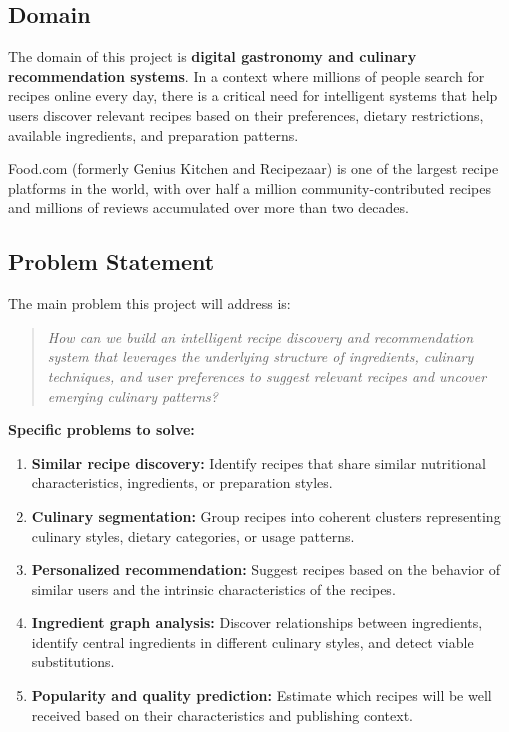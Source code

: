 \documentclass[11pt,a4paper]{article}
\begin{document}
\subsection{Domain}

The domain of this project is \textbf{digital gastronomy and culinary recommendation systems}. In a context where millions of people search for recipes online every day, there is a critical need for intelligent systems that help users discover relevant recipes based on their preferences, dietary restrictions, available ingredients, and preparation patterns.

Food.com (formerly Genius Kitchen and Recipezaar) is one of the largest recipe platforms in the world, with over half a million community-contributed recipes and millions of reviews accumulated over more than two decades.

\subsection{Problem Statement}

The main problem this project will address is:

\begin{quote}
\textit{How can we build an intelligent recipe discovery and recommendation system that leverages the underlying structure of ingredients, culinary techniques, and user preferences to suggest relevant recipes and uncover emerging culinary patterns?}
\end{quote}

\textbf{Specific problems to solve:}

\begin{enumerate}
    \item \textbf{Similar recipe discovery:} Identify recipes that share similar nutritional characteristics, ingredients, or preparation styles.

    \item \textbf{Culinary segmentation:} Group recipes into coherent clusters representing culinary styles, dietary categories, or usage patterns.

    \item \textbf{Personalized recommendation:} Suggest recipes based on the behavior of similar users and the intrinsic characteristics of the recipes.

    \item \textbf{Ingredient graph analysis:} Discover relationships between ingredients, identify central ingredients in different culinary styles, and detect viable substitutions.

    \item \textbf{Popularity and quality prediction:} Estimate which recipes will be well received based on their characteristics and publishing context.
\end{enumerate}
\end{document}

